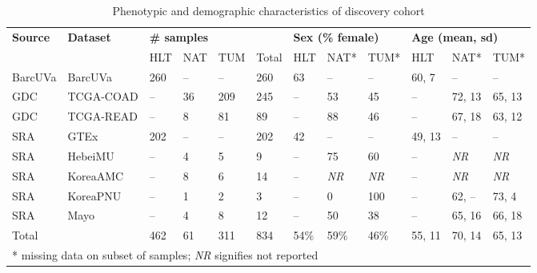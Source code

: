 \begin{table}[ht]
    \small
    \centering
    \caption{Phenotypic and demographic characteristics of discovery cohort}
    \label{tab:discovery}
    \begin{tabular}{ll|llll|lll|lll}
        \textbf{Source} & \textbf{Dataset} & \multicolumn{4}{l|}{\textbf{\# samples}} & \multicolumn{3}{l|}{\textbf{Sex (\% female)}} & \multicolumn{3}{l}{\textbf{Age (mean, sd)}} \\
        \cline{3-12}
         & & HLT & NAT & TUM & Total & HLT & NAT* & TUM* & HLT & NAT* & TUM* \\
        \hline
        BarcUVa & BarcUVa & 260 & -- & -- & 260 & 63 & -- & -- & 60, 7 & -- & -- \\
        GDC & TCGA-COAD & -- & 36 & 209 & 245 & -- & 53 & 45 & -- & 72, 13 & 65, 13 \\
        GDC & TCGA-READ & -- & 8 & 81 & 89 & -- & 88 & 46 & -- & 67, 18 & 63, 12 \\
        SRA & GTEx & 202 & -- & -- & 202 & 42 & -- & -- & 49, 13 & -- & -- \\
        SRA & HebeiMU & -- & 4 & 5 & 9 & -- & 75 & 60 & -- & \emph{NR} & \emph{NR} \\
        SRA & KoreaAMC & -- & 8 & 6 & 14 & -- & \emph{NR} & \emph{NR} & -- & \emph{NR} & \emph{NR} \\
        SRA & KoreaPNU & -- & 1 & 2 & 3 & -- & 0 & 100 & -- & 62, -- & 73, 4 \\
        SRA & Mayo & -- & 4 & 8 & 12 & -- & 50 & 38 & -- & 65, 16 & 66, 18 \\
        \hline
        Total &  & 462 & 61 & 311 & 834 & 54\% & 59\% & 46\% & 55, 11 & 70, 14 & 65, 13 \\
        \hline
        \multicolumn{12}{l}{* missing data on subset of samples; \emph{NR} signifies not reported}
    \end{tabular}
\end{table}
